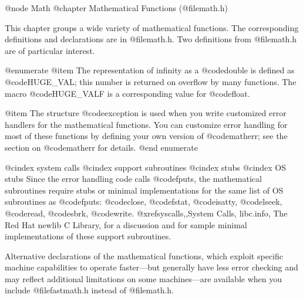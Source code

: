 @node Math
@chapter Mathematical Functions (@file{math.h})

This chapter groups a wide variety of mathematical functions.  The
corresponding definitions and declarations are in @file{math.h}.  
Two definitions from @file{math.h} are of particular interest.  

@enumerate
@item
The representation of infinity as a @code{double} is defined as
@code{HUGE_VAL}; this number is returned on overflow by many functions.
The macro @code{HUGE_VALF} is a corresponding value for @code{float}.

@item
The structure @code{exception} is used when you write customized error
handlers for the mathematical functions.  You can customize error
handling for most of these functions by defining your own version of
@code{matherr}; see the section on @code{matherr} for details.
@end enumerate

@cindex system calls
@cindex support subroutines
@cindex stubs
@cindex OS stubs
Since the error handling code calls @code{fputs}, the mathematical
subroutines require stubs or minimal implementations for the same list
of OS subroutines as @code{fputs}: @code{close}, @code{fstat},
@code{isatty}, @code{lseek}, @code{read}, @code{sbrk}, @code{write}.
@xref{syscalls,,System Calls, libc.info, The Red Hat newlib C Library},
for a discussion and for sample minimal implementations of these support
subroutines.

Alternative declarations of the mathematical functions, which exploit
specific machine capabilities to operate faster---but generally have
less error checking and may reflect additional limitations on some
machines---are available when you include @file{fastmath.h} instead of
@file{math.h}.

